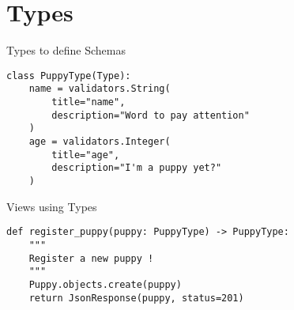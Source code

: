 \section{Types}
\begin{frame}[fragile]{Types to define Schemas}
    \begin{verbatim}
class PuppyType(Type):
    name = validators.String(
        title="name",
        description="Word to pay attention"
    )
    age = validators.Integer(
        title="age",
        description="I'm a puppy yet?"
    )
    \end{verbatim}
\end{frame}

\begin{frame}[fragile]{Views using Types}
    \begin{verbatim}
def register_puppy(puppy: PuppyType) -> PuppyType:
    """
    Register a new puppy !
    """
    Puppy.objects.create(puppy)
    return JsonResponse(puppy, status=201)
    \end{verbatim}
\end{frame}
